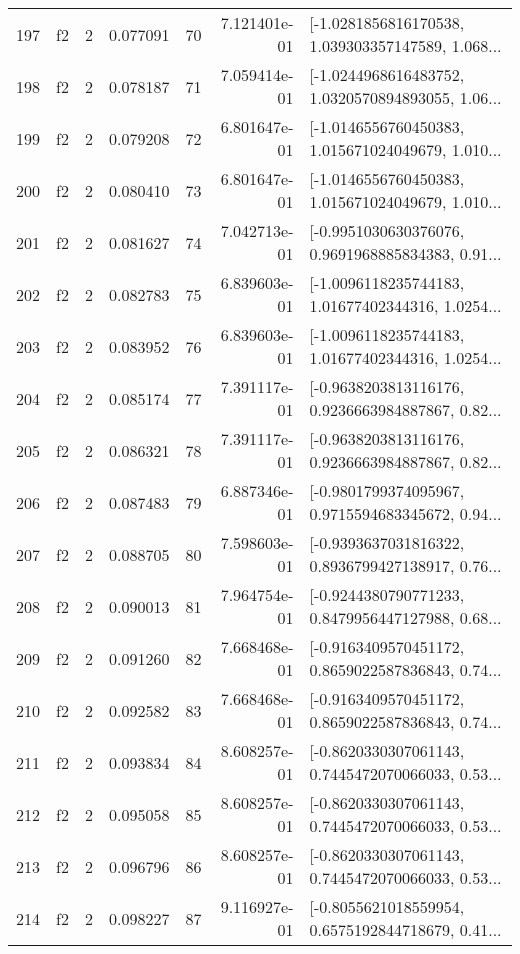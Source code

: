 \begin{tabular}{lllrlrl}
197 &  f2 &   2 &  0.077091 &   70 &  7.121401e-01 &  [-1.0281856816170538, 1.039303357147589, 1.068... \\
198 &  f2 &   2 &  0.078187 &   71 &  7.059414e-01 &  [-1.0244968616483752, 1.0320570894893055, 1.06... \\
199 &  f2 &   2 &  0.079208 &   72 &  6.801647e-01 &  [-1.0146556760450383, 1.015671024049679, 1.010... \\
200 &  f2 &   2 &  0.080410 &   73 &  6.801647e-01 &  [-1.0146556760450383, 1.015671024049679, 1.010... \\
201 &  f2 &   2 &  0.081627 &   74 &  7.042713e-01 &  [-0.9951030630376076, 0.9691968885834383, 0.91... \\
202 &  f2 &   2 &  0.082783 &   75 &  6.839603e-01 &  [-1.0096118235744183, 1.01677402344316, 1.0254... \\
203 &  f2 &   2 &  0.083952 &   76 &  6.839603e-01 &  [-1.0096118235744183, 1.01677402344316, 1.0254... \\
204 &  f2 &   2 &  0.085174 &   77 &  7.391117e-01 &  [-0.9638203813116176, 0.9236663984887867, 0.82... \\
205 &  f2 &   2 &  0.086321 &   78 &  7.391117e-01 &  [-0.9638203813116176, 0.9236663984887867, 0.82... \\
206 &  f2 &   2 &  0.087483 &   79 &  6.887346e-01 &  [-0.9801799374095967, 0.9715594683345672, 0.94... \\
207 &  f2 &   2 &  0.088705 &   80 &  7.598603e-01 &  [-0.9393637031816322, 0.8936799427138917, 0.76... \\
208 &  f2 &   2 &  0.090013 &   81 &  7.964754e-01 &  [-0.9244380790771233, 0.8479956447127988, 0.68... \\
209 &  f2 &   2 &  0.091260 &   82 &  7.668468e-01 &  [-0.9163409570451172, 0.8659022587836843, 0.74... \\
210 &  f2 &   2 &  0.092582 &   83 &  7.668468e-01 &  [-0.9163409570451172, 0.8659022587836843, 0.74... \\
211 &  f2 &   2 &  0.093834 &   84 &  8.608257e-01 &  [-0.8620330307061143, 0.7445472070066033, 0.53... \\
212 &  f2 &   2 &  0.095058 &   85 &  8.608257e-01 &  [-0.8620330307061143, 0.7445472070066033, 0.53... \\
213 &  f2 &   2 &  0.096796 &   86 &  8.608257e-01 &  [-0.8620330307061143, 0.7445472070066033, 0.53... \\
214 &  f2 &   2 &  0.098227 &   87 &  9.116927e-01 &  [-0.8055621018559954, 0.6575192844718679, 0.41... \\

\end{tabular}
